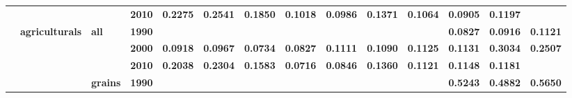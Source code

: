 \documentclass[
  authoryear,
  preprint,
  3p]{elsarticle}
\begin{document}
\begin{landscape}
\begin{longtable}[t]{>{}l>{}l>{}l>{}l>{}r>{}r>{}r>{}r>{}r>{}r>{}r>{}r>{}r>{}r}
\addlinespace
\textbf{} & \textbf{} & \textbf{} & \textbf{2010} & \textcolor[HTML]{4285f4}{\textbf{0.2275}} & \textcolor[HTML]{4285f4}{\textbf{0.2541}} & \textcolor[HTML]{4285f4}{\textbf{0.1850}} & \textcolor[HTML]{4285f4}{\textbf{0.1018}} & \textcolor[HTML]{4285f4}{\textbf{0.0986}} & \textcolor[HTML]{4285f4}{\textbf{0.1371}} & \textcolor[HTML]{4285f4}{\textbf{0.1064}} & \textcolor[HTML]{4285f4}{\textbf{0.0905}} & \textcolor[HTML]{4285f4}{\textbf{0.1197}} & \textcolor[HTML]{4285f4}{\textbf{}}\\
\textbf{} & \textbf{agriculturals} & \textbf{all} & \textbf{1990} & \textcolor[HTML]{4285f4}{\textbf{}} & \textcolor[HTML]{4285f4}{\textbf{}} & \textcolor[HTML]{4285f4}{\textbf{}} & \textcolor[HTML]{4285f4}{\textbf{}} & \textcolor[HTML]{4285f4}{\textbf{}} & \textcolor[HTML]{4285f4}{\textbf{}} & \textcolor[HTML]{4285f4}{\textbf{}} & \textcolor[HTML]{4285f4}{\textbf{0.0827}} & \textcolor[HTML]{4285f4}{\textbf{0.0916}} & \textcolor[HTML]{4285f4}{\textbf{0.1121}}\\
\textbf{} & \textbf{} & \textbf{} & \textbf{2000} & \textcolor[HTML]{4285f4}{\textbf{0.0918}} & \textcolor[HTML]{4285f4}{\textbf{0.0967}} & \textcolor[HTML]{4285f4}{\textbf{0.0734}} & \textcolor[HTML]{4285f4}{\textbf{0.0827}} & \textcolor[HTML]{4285f4}{\textbf{0.1111}} & \textcolor[HTML]{4285f4}{\textbf{0.1090}} & \textcolor[HTML]{4285f4}{\textbf{0.1125}} & \textcolor[HTML]{4285f4}{\textbf{0.1131}} & \textcolor[HTML]{4285f4}{\textbf{0.3034}} & \textcolor[HTML]{4285f4}{\textbf{0.2507}}\\
\textbf{} & \textbf{} & \textbf{} & \textbf{2010} & \textcolor[HTML]{4285f4}{\textbf{0.2038}} & \textcolor[HTML]{4285f4}{\textbf{0.2304}} & \textcolor[HTML]{4285f4}{\textbf{0.1583}} & \textcolor[HTML]{4285f4}{\textbf{0.0716}} & \textcolor[HTML]{4285f4}{\textbf{0.0846}} & \textcolor[HTML]{4285f4}{\textbf{0.1360}} & \textcolor[HTML]{4285f4}{\textbf{0.1121}} & \textcolor[HTML]{4285f4}{\textbf{0.1148}} & \textcolor[HTML]{4285f4}{\textbf{0.1181}} & \textcolor[HTML]{4285f4}{\textbf{}}\\
\textbf{} & \textbf{} & \textbf{grains} & \textbf{1990} & \textcolor[HTML]{4285f4}{\textbf{}} & \textcolor[HTML]{4285f4}{\textbf{}} & \textcolor[HTML]{4285f4}{\textbf{}} & \textcolor[HTML]{4285f4}{\textbf{}} & \textcolor[HTML]{4285f4}{\textbf{}} & \textcolor[HTML]{4285f4}{\textbf{}} & \textcolor[HTML]{4285f4}{\textbf{}} & \textcolor[HTML]{4285f4}{\textbf{0.5243}} & \textcolor[HTML]{4285f4}{\textbf{0.4882}} & \textcolor[HTML]{4285f4}{\textbf{0.5650}}\\

\end{longtable}
\end{landscape}
\end{document}
